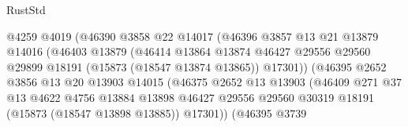 \begin{lexlean}{RustStd}
\begin{coremodule}
                                    @4259
                                    @4019
                                    (@46390
                                      @3858
                                      @22
                                      @14017
                                      (@46396
                                        @3857
                                        @13
                                        @21
                                        @13879
                                        @14016
                                        (@46403
                                          @13879
                                          (@46414
                                            @13864
                                            @13874
                                            @46427
                                            @29556
                                            @29560
                                            @29899
                                            @18191
                                            (@15873 (@18547 @13874 @13865))
                                            @17301))
                                        (@46395
                                          @2652
                                          @3856
                                          @13
                                          @20
                                          @13903
                                          @14015
                                          (@46375
                                            @2652
                                            @13
                                            @13903
                                            (@46409
                                              @271
                                              @37
                                              @13
                                              @4622
                                              @4756
                                              @13884
                                              @13898
                                              @46427
                                              @29556
                                              @29560
                                              @30319
                                              @18191
                                              (@15873 (@18547 @13898 @13885))
                                              @17301))
                                          (@46395
                                            @3739

\end{coremodule}
\end{lexlean}
